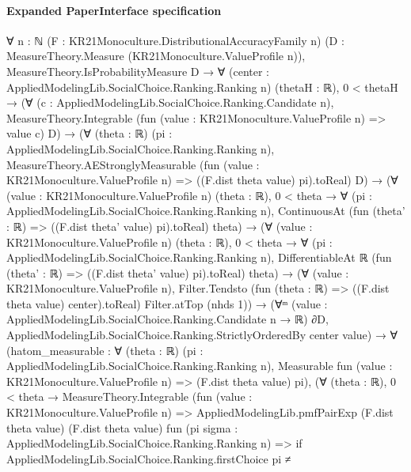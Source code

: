 \documentclass[10pt]{article}
\begin{document}
\paragraph{Expanded PaperInterface specification}
\begin{ReviewVerbatim}
∀ {n : ℕ} (F : KR21Monoculture.DistributionalAccuracyFamily n)
  (D : MeasureTheory.Measure (KR21Monoculture.ValueProfile n)),
  MeasureTheory.IsProbabilityMeasure D →
    ∀ (center : AppliedModelingLib.SocialChoice.Ranking.Ranking n) (thetaH : ℝ),
      0 < thetaH →
        (∀ (c : AppliedModelingLib.SocialChoice.Ranking.Candidate n),
            MeasureTheory.Integrable (fun (value : KR21Monoculture.ValueProfile n) => value c) D) →
          (∀ (theta : ℝ) (pi : AppliedModelingLib.SocialChoice.Ranking.Ranking n),
              MeasureTheory.AEStronglyMeasurable
                (fun (value : KR21Monoculture.ValueProfile n) => ((F.dist theta value) pi).toReal) D) →
            (∀ (value : KR21Monoculture.ValueProfile n) (theta : ℝ),
                0 < theta →
                  ∀ (pi : AppliedModelingLib.SocialChoice.Ranking.Ranking n),
                    ContinuousAt (fun (theta' : ℝ) => ((F.dist theta' value) pi).toReal) theta) →
              (∀ (value : KR21Monoculture.ValueProfile n) (theta : ℝ),
                  0 < theta →
                    ∀ (pi : AppliedModelingLib.SocialChoice.Ranking.Ranking n),
                      DifferentiableAt ℝ (fun (theta' : ℝ) => ((F.dist theta' value) pi).toReal) theta) →
                (∀ (value : KR21Monoculture.ValueProfile n),
                    Filter.Tendsto (fun (theta : ℝ) => ((F.dist theta value) center).toReal) Filter.atTop (nhds 1)) →
                  (∀ᵐ (value : AppliedModelingLib.SocialChoice.Ranking.Candidate n → ℝ) ∂D,
                      AppliedModelingLib.SocialChoice.Ranking.StrictlyOrderedBy center value) →
                    ∀
                      (hatom_measurable :
                        ∀ (theta : ℝ) (pi : AppliedModelingLib.SocialChoice.Ranking.Ranking n),
                          Measurable fun (value : KR21Monoculture.ValueProfile n) => (F.dist theta value) pi),
                      (∀ (theta : ℝ),
                          0 < theta →
                            MeasureTheory.Integrable
                              (fun (value : KR21Monoculture.ValueProfile n) =>
                                AppliedModelingLib.pmfPairExp (F.dist theta value) (F.dist theta value)
                                  fun (pi sigma : AppliedModelingLib.SocialChoice.Ranking.Ranking n) =>
                                  if
                                      AppliedModelingLib.SocialChoice.Ranking.firstChoice pi ≠

\end{ReviewVerbatim}
\end{document}
